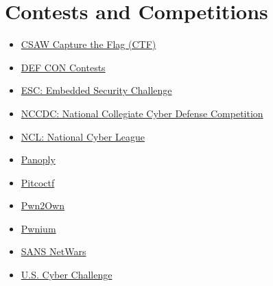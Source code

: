 \documentclass[a4paper, 12pt, titlepage]{report}
\begin{document}
\section{Contests and Competitions}
\begin{multicols}{2}
\begin{itemize}
\item \href{https://csaw.engineering.nyu.edu/}{CSAW Capture the Flag (CTF)}
\item \href{https://www.defcon.org/html/defcon-15/dc-15-contests.html}{DEF CON Contests}
\item \href{https://csaw.engineering.nyu.edu/esc}{ESC: Embedded Security Challenge}
\item \href{http://www.nationalccdc.org/}{NCCDC: National Collegiate Cyber Defense Competition}
\item \href{https://www.nationalcyberleague.org/}{NCL: National Cyber League}
\item \href{http://cyberpanoply.com/}{Panoply}
\item \href{https://picoctf.com/}{Pitcoctf}
\item \href{https://en.wikipedia.org/wiki/Pwn2Own}{Pwn2Own}
\item \href{https://www.chromium.org/Home/chromium-security}{Pwnium}
\item \href{https://www.sans.org/netwars}{SANS NetWars}
\item \href{https://www.uscyberchallenge.org/}{U.S. Cyber Challenge}
\end{itemize}
\end{multicols}
\end{document}
